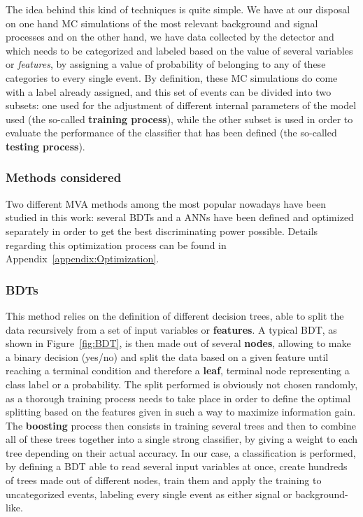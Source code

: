 \documentclass[a4paper, 10pt, openright]{report}
\begin{document}
The idea behind this kind of techniques is quite simple. We have at our disposal on one hand \ac{MC} simulations of the most relevant background and signal processes and on the other hand, we have data collected by the detector and which needs to be categorized and labeled based on the value of several variables or \textit{features}, by assigning a value of probability of belonging to any of these categories to every single event. By definition, these \ac{MC} simulations do come with a label already assigned, and this set of events can be divided into two subsets: one used for the adjustment of different internal parameters of the model used (the so-called \textbf{training process}), while the other subset is used in order to evaluate the performance of the classifier that has been defined (the so-called \textbf{testing process}).

\subsubsection{Methods considered}

Two different \ac{MVA} methods among the most popular nowadays have been studied in this work: several \acfp{BDT} and a \acfp{ANN} have been defined and optimized separately in order to get the best discriminating power possible. Details regarding this optimization process can be found in Appendix~\ref{appendix:Optimization}.

\subsubsection*{\acfp{BDT}}\label{section:BDT}

This method relies on the definition of different decision trees, able to split the data recursively from a set of input variables or \textbf{features}. A typical \ac{BDT}, as shown in Figure~\ref{fig:BDT}, is then made out of several \textbf{nodes}, allowing to make a binary decision (yes/no) and split the data based on a given feature until reaching a terminal condition and therefore a \textbf{leaf}, terminal node representing a class label or a probability. The split performed is obviously not chosen randomly, as a thorough training process needs to take place in order to define the optimal splitting based on the features given in such a way to maximize information gain. The \textbf{boosting} process then consists in training several trees and then to combine all of these trees together into a single strong classifier, by giving a weight to each tree depending on their actual accuracy. In our case, a classification is performed, by defining a \ac{BDT} able to read several input variables at once, create hundreds of trees made out of different nodes, train them and apply the training to uncategorized events, labeling every single event as either signal or background-like.
\end{document}
